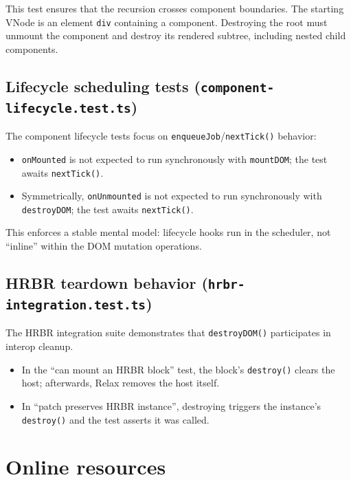 This test ensures that the recursion crosses component boundaries.
The starting VNode is an element \texttt{div} containing a component.
Destroying the root must unmount the component and destroy its rendered subtree, including nested child components.

\subsection{Lifecycle scheduling tests (\texttt{component-lifecycle.test.ts})}

The component lifecycle tests focus on \texttt{enqueueJob}/\texttt{nextTick()} behavior:

\begin{itemize}
  \item \texttt{onMounted} is not expected to run synchronously with \texttt{mountDOM}; the test awaits \texttt{nextTick()}.
  \item Symmetrically, \texttt{onUnmounted} is not expected to run synchronously with \texttt{destroyDOM}; the test awaits \texttt{nextTick()}.
\end{itemize}

This enforces a stable mental model: lifecycle hooks run in the scheduler, not ``inline'' within the DOM mutation operations.

\subsection{HRBR teardown behavior (\texttt{hrbr-integration.test.ts})}

The HRBR integration suite demonstrates that \texttt{destroyDOM()} participates in interop cleanup.

\begin{itemize}
  \item In the ``can mount an HRBR block'' test, the block's \texttt{destroy()} clears the host; afterwards, Relax removes the host itself.
  \item In ``patch preserves HRBR instance'', destroying triggers the instance's \texttt{destroy()} and the test asserts it was called.
\end{itemize}

\section{Online resources}

